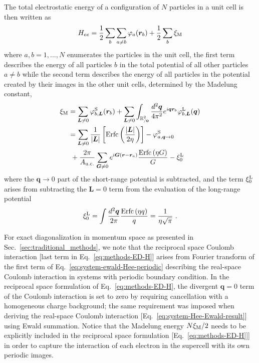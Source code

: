\documentclass[
 reprint,
 amsmath,amssymb,
 aps, prx,
floatfix,longbibliography,
]{revtex4-2}
\begin{document}
\begin{appendix}
The total electrostatic energy of a configuration of $N$ particles
in a unit cell is then written as
\begin{equation}
    H_{ee}=\frac{1}{2}\sum_{b}\sum_{a\neq b}\varphi_{a}(\bm{r}_{b})+\frac{1}{2}\sum_{b}\xi_{{\rm M}}
    \label{eq:system-Hee-Ewald-result}
\end{equation}
where $a,b=1,...,N$ enumerates the particles in the unit cell, the
first term describes the energy of all particles $b$ in the total
potential of all other particles $a\neq b$ while the second term
describes the energy of all particles in the potential created by
their images in the other unit cells, determined by the Madelung constant,
\begin{align}
\xi_{{\rm M}} & =\sum_{\bm{L}\neq0}\varphi_{b,\bm{L}}^{{\rm S}}(\bm{r}_{b})+\sum_{\bm{L}\neq0}\int_{\mathbb{R}_{/\bm{0}}^{2}}\frac{d^{2}\bm{q}}{4\pi^{2}}e^{i\bm{q}\bm{r}_{b}}\varphi_{b,\bm{L}}^{{\rm L}}(\bm{q}) \nonumber \\
 & =\sum_{\bm{L}\neq0}\frac{1}{|\bm{L}|}\left[{\rm Erfc}\left(\frac{|\bm{L}|}{2\eta}\right)\right]-\varphi_{a,\bm{q}\to0}^{{\rm S}} \nonumber\\
 & \ +\frac{2\pi}{A_{{\rm u.c.}}}\sum_{\bm{G}\neq0}e^{i\bm{G}(\bm{r}-\bm{r}_{a})}\frac{{\rm Erfc}\left(\eta G\right)}{G}-\xi_{0}^{{\rm L}} 
 \label{eq:system-Madelung-Ewald-result}
\end{align}
where the $\bm{q}\to0$ part of the short-range potential is subtracted,
and the term $\xi_{0}^{{\rm L}}$ arises from subtracting the $\bm{L}=0$
term from the evaluation of the long-range potential
\begin{align*}
\xi_{0}^{{\rm L}} =\int \frac{d^{2}\bm{q}}{2\pi}\frac{{\rm Erfc}\left(\eta q\right)}{q}=\frac{1}{\eta \sqrt{\pi}} \ .
\end{align*}

For exact diagonalization in momentum space as presented in Sec.~\ref{sec:traditional_methods}, we note that the reciprocal space Coulomb interaction [last term in Eq.~\eqref{eq:methods-ED-H}] arises from Fourier transform of the first term of Eq.~\eqref{eq:system-ewald-Hee-periodic} describing the real-space Coulomb interaction in systems with periodic boundary condition. 
In the reciprocal space formulation of Eq.~\eqref{eq:methods-ED-H}, the divergent $\bm q = 0$ term of the Coulomb interaction is set to zero by requiring cancellation with a homogeneous charge background; the same requirement was imposed when deriving the real-space Coulomb interaction [Eq.~\eqref{eq:system-Hee-Ewald-result}] using Ewald summation. 
Notice that the Madelung energy $N \xi_{\rm M}/2$ needs to be explicitly included in the reciprocal space formulation [Eq.~\eqref{eq:methods-ED-H}]] in order to capture the interaction of each electron in the supercell with its own periodic images.




\end{appendix}
\end{document}
